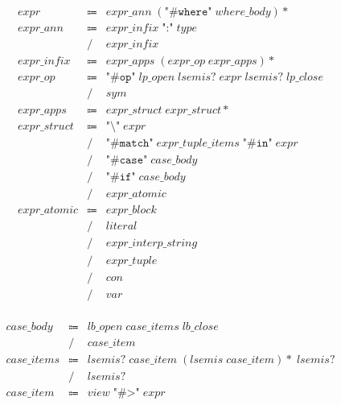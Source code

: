 \begin{align*}
    \begin{array}{rcll}
        \mathit{expr}
        &\Coloneq &\mathit{expr\_ann}\; (\texttt{"\#where"}\; \mathit{where\_body}){*} \\
        \mathit{expr\_ann}
        &\Coloneq &\mathit{expr\_infix}\; \texttt{":"}\; \mathit{type} \\
        &\mathrel{/} &\mathit{expr\_infix} \\
        \mathit{expr\_infix}
        &\Coloneq &\mathit{expr\_apps}\; (\mathit{expr\_op}\; \mathit{expr\_apps}){*} \\
        \mathit{expr\_op}
        &\Coloneq &\texttt{"\#op"}\; \mathit{lp\_open}\; \mathit{lsemis}{?}\; \mathit{expr}\; \mathit{lsemis}{?}\; \mathit{lp\_close} \\
        &\mathrel{/} &\mathit{sym} \\
        \mathit{expr\_apps}
        &\Coloneq &\mathit{expr\_struct}\; \mathit{expr\_struct}{*} \\
        \mathit{expr\_struct}
        &\Coloneq &\texttt{"\textbackslash"}\; \mathit{expr} \\
        &\mathrel{/} &\texttt{"\#match"}\; \mathit{expr\_tuple\_items}\; \texttt{"\#in"}\; \mathit{expr} \\
        &\mathrel{/} &\texttt{"\#case"}\; \mathit{case\_body} \\
        &\mathrel{/} &\texttt{"\#if"}\; \mathit{case\_body} \\
        &\mathrel{/} &\mathit{expr\_atomic} \\
        \mathit{expr\_atomic}
        &\Coloneq &\mathit{expr\_block} \\
        &\mathrel{/} &\mathit{literal} \\
        &\mathrel{/} &\mathit{expr\_interp\_string} \\
        &\mathrel{/} &\mathit{expr\_tuple} \\
        &\mathrel{/} &\mathit{con} \\
        &\mathrel{/} &\mathit{var}
    \end{array}
\end{align*}

\begin{align*}
    \begin{array}{rcll}
        \mathit{case\_body}
        &\Coloneq &\mathit{lb\_open}\; \mathit{case\_items}\; \mathit{lb\_close} \\
        &\mathrel{/} &\mathit{case\_item} \\
        \mathit{case\_items}
        &\Coloneq &\mathit{lsemis}{?}\; \mathit{case\_item}\; (\mathit{lsemis}\; \mathit{case\_item}){*}\; \mathit{lsemis}{?} \\
        &\mathrel{/} &\mathit{lsemis}{?} \\
        \mathit{case\_item}
        &\Coloneq &\mathit{view}\; \texttt{"\#>"}\; \mathit{expr}
    \end{array}
\end{align*}

